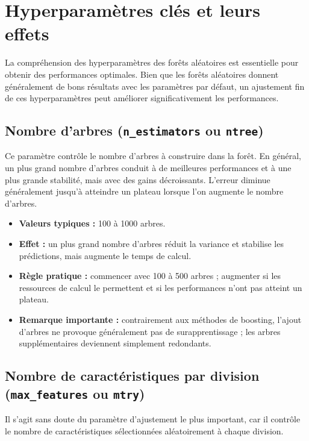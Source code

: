 \section{Hyperparamètres clés et leurs effets}

La compréhension des hyperparamètres des forêts aléatoires est essentielle pour obtenir des performances optimales. Bien que les forêts aléatoires donnent généralement de bons résultats avec les paramètres par défaut, un ajustement fin de ces hyperparamètres peut améliorer significativement les performances.

\subsection{Nombre d’arbres (\texttt{n\_estimators} ou \texttt{ntree})}

Ce paramètre contrôle le nombre d’arbres à construire dans la forêt. En général, un plus grand nombre d’arbres conduit à de meilleures performances et à une plus grande stabilité, mais avec des gains décroissants. L’erreur diminue généralement jusqu’à atteindre un plateau lorsque l’on augmente le nombre d’arbres.

\begin{itemize}
    \item \textbf{Valeurs typiques :} 100 à 1000 arbres.
    \item \textbf{Effet :} un plus grand nombre d’arbres réduit la variance et stabilise les prédictions, mais augmente le temps de calcul.
    \item \textbf{Règle pratique :} commencer avec 100 à 500 arbres ; augmenter si les ressources de calcul le permettent et si les performances n’ont pas atteint un plateau.
    \item \textbf{Remarque importante :} contrairement aux méthodes de boosting, l’ajout d’arbres ne provoque généralement pas de surapprentissage ; les arbres supplémentaires deviennent simplement redondants.
\end{itemize}

\subsection{Nombre de caractéristiques par division (\texttt{max\_features} ou \texttt{mtry})}

Il s’agit sans doute du paramètre d’ajustement le plus important, car il contrôle le nombre de caractéristiques sélectionnées aléatoirement à chaque division.


